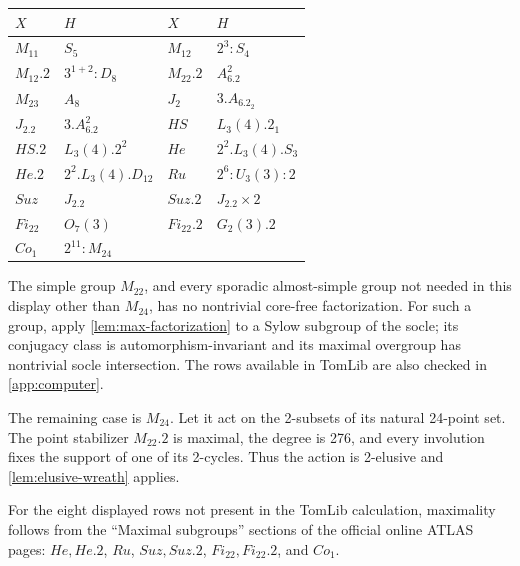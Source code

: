\documentclass[11pt]{amsart}
\theoremstyle{definition}
\begin{document}
\begin{center}
\begin{tabular}{ll@{\qquad}ll}
\toprule
\(X\)&\(H\)&\(X\)&\(H\)\\
\midrule
\(M_{11}\)&\(S_5\)&\(M_{12}\)&\(2^3{:}S_4\)\\
\(M_{12}.2\)&\(3^{1+2}{:}D_8\)&\(M_{22}.2\)&\(A_6.2^2\)\\
\(M_{23}\)&\(A_8\)&\(J_2\)&\(3.A_6.2_2\)\\
\(J_2.2\)&\(3.A_6.2^2\)&\(HS\)&\(L_3(4).2_1\)\\
\(HS.2\)&\(L_3(4).2^2\)&\(He\)&\(2^2.L_3(4).S_3\)\\
\(He.2\)&\(2^2.L_3(4).D_{12}\)&\(Ru\)&\(2^6{:}U_3(3){:}2\)\\
\(Suz\)&\(J_2.2\)&\(Suz.2\)&\(J_2.2\times2\)\\
\(Fi_{22}\)&\(O_7(3)\)&\(Fi_{22}.2\)&\(G_2(3).2\)\\
\(Co_1\)&\(2^{11}{:}M_{24}\)&&\\
\bottomrule
\end{tabular}
\end{center}

The simple group \(M_{22}\), and every sporadic almost-simple group not
needed in this display other than \(M_{24}\), has no nontrivial core-free
factorization.  For such a group, apply \cref{lem:max-factorization} to a Sylow
subgroup of the socle;
its conjugacy class is automorphism-invariant and its maximal overgroup has
nontrivial socle intersection. The rows available in TomLib are also checked
in \cref{app:computer}.

The remaining case is \(M_{24}\).  Let it act on the 2-subsets of
its natural 24-point set.  The point stabilizer \(M_{22}.2\) is maximal, the
degree is 276, and every involution fixes the support of one of its 2-cycles.
Thus the action is 2-elusive and \cref{lem:elusive-wreath} applies.

For the eight displayed rows not present in the TomLib calculation,
maximality follows from the ``Maximal subgroups'' sections of the official
online ATLAS pages:
\href{https://brauer.maths.qmul.ac.uk/Atlas/v3/spor/He/#maxes}{\(He,He.2\)},
\href{https://brauer.maths.qmul.ac.uk/Atlas/v3/spor/Ru/#maxes}{\(Ru\)},
\href{https://brauer.maths.qmul.ac.uk/Atlas/v3/spor/Suz/#maxes}{\(Suz,Suz.2\)},
\href{https://brauer.maths.qmul.ac.uk/Atlas/v3/spor/F22/#maxes}{\(Fi_{22},Fi_{22}.2\)},
and \href{https://brauer.maths.qmul.ac.uk/Atlas/v3/spor/Co1/#maxes}{\(Co_1\)}.
\end{document}
